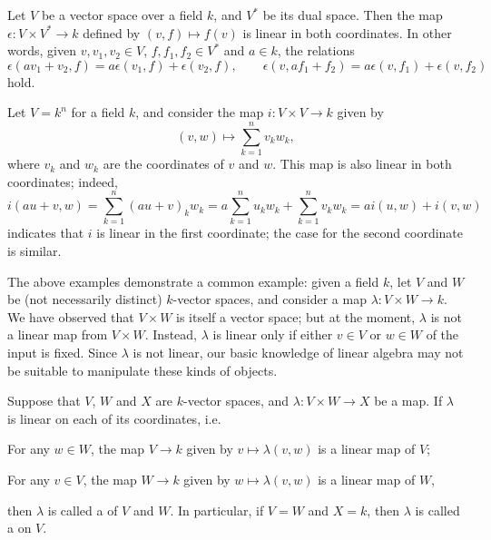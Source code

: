 \label{sec:bilinear}

\begin{example}
    \label{exm:bilinear}
    Let \(V\) be a vector space over a field \(k\),
    and \(V^*\) be its dual space.
    Then the map \(\epsilon:V\times V^*\to k\) defined by
    \((v,f)\mapsto f(v)\)
    is linear in both coordinates.
    In other words, given
    \(v,v_1,v_2\in V\), \(f,f_1,f_2\in V^*\) and \(a\in k\),
    the relations
    \[
        \epsilon(av_1+v_2,f)
        =a\epsilon(v_1,f)+\epsilon(v_2,f),
        \qquad
        \epsilon(v,af_1+f_2)
        =a\epsilon(v,f_1)+\epsilon(v,f_2)
    \]
    hold.
\end{example}
\begin{example}
    \label{exm:bilinear2}
    Let \(V=k^n\) for a field \(k\),
    and consider the map \(i:V\times V\to k\) given by
    \[
        (v,w)\mapsto\sum_{k=1}^nv_kw_k,
    \]
    where \(v_k\) and \(w_k\) are the coordinates of \(v\) and \(w\).
    This map is also linear in both coordinates; indeed,
    \[
        i(au+v,w)
        =\sum_{k=1}^{n}(au+v)_kw_k
        =a\sum_{k=1}^{n}u_kw_k+\sum_{k=1}^{n}v_kw_k
        =ai(u,w)+i(v,w)
    \]
    indicates that \(i\) is linear in the first coordinate;
    the case for the second coordinate is similar.
\end{example}

The above examples demonstrate a common example:
given a field \(k\), let \(V\) and \(W\) be
(not necessarily distinct) \(k\)-vector spaces,
and consider a map \(\lambda:V\times W\to k\).
We have observed that
\(V\times W\) is itself a vector space;
but at the moment, \(\lambda\) is not a linear map from \(V\times W\).
Instead, \(\lambda\) is linear only if
either \(v\in V\) or \(w\in W\) of the input is fixed.
Since \(\lambda\) is not linear,
our basic knowledge of linear algebra may not be suitable
to manipulate these kinds of objects.

\begin{definition}
    \label{def:bilinear}
    Suppose that \(V\), \(W\) and \(X\) are \(k\)-vector spaces,
    and \(\lambda:V\times W\to X\) be a map.
    If \(\lambda\) is linear on each of its coordinates, i.e.
    \begin{axioms}[BL]
        \item For any \(w\in W\),
        the map \(V\to k\) given by \(v\mapsto\lambda(v,w)\)
        is a linear map of \(V\);
        \item For any \(v\in V\),
        the map \(W\to k\) given by \(w\mapsto\lambda(v,w)\)
        is a linear map of \(W\),
    \end{axioms}
    then \(\lambda\) is called
    a  of \(V\) and \(W\).
    In particular, if \(V=W\) and \(X=k\),
    then \(\lambda\) is called
    a  on \(V\).
\end{definition}

